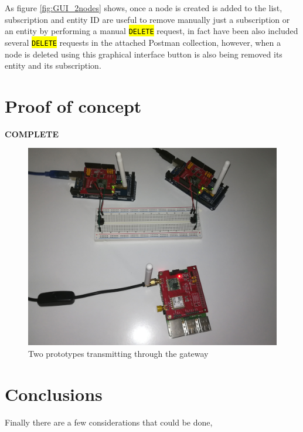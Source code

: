 \documentclass[11pt,a4paper,dvipsnames,twoside]{article}
\newcommand{\doubt}[1] {\textbf{\color{Red3}#1}}
\newcommand{\cmd}[1] {\hl{\texttt{#1}}}
\begin{document}
As figure \ref{fig:GUI_2nodes} shows, once a node is created is added to the list, subscription and entity ID are useful to remove manually just a subscription or an entity by performing a manual \cmd{DELETE} request, in fact have been also included several \cmd{DELETE} requests in the attached Postman collection, however, when a node is deleted using this graphical interface button is also being removed its entity and its subscription.

\newpage\thispagestyle{plain}
\section{Proof of concept}
\doubt{COMPLETE}

\begin{figure}[ht]
  \centering
  \includegraphics[width=.8\textwidth]{../pictures/2prototypes_1gateway.jpg}  
  \caption{Two prototypes transmitting through the gateway}
  \label{fig:2nodes_gateway}
\end{figure}

\newpage\thispagestyle{plain}
\section{Conclusions}
Finally there are a few considerations that could be done, 
\end{document}
